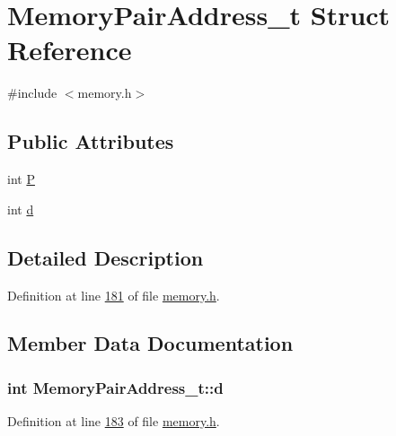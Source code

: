 \hypertarget{structMemoryPairAddress__t}{}\section{Memory\+Pair\+Address\+\_\+t Struct Reference}
\label{structMemoryPairAddress__t}


{\ttfamily \#include $<$memory.\+h$>$}

\subsection*{Public Attributes}
\begin{DoxyCompactItemize}
\item 
int \hyperlink{structMemoryPairAddress__t_a5bc11426b27565b959f280dd1a18b080}{P}
\item 
int \hyperlink{structMemoryPairAddress__t_ad608e86288286889c2658e8043414edf}{d}
\end{DoxyCompactItemize}


\subsection{Detailed Description}


Definition at line \hyperlink{memory_8h_source_l00181}{181} of file \hyperlink{memory_8h_source}{memory.\+h}.



\subsection{Member Data Documentation}
\subsubsection[{\texorpdfstring{d}{d}}]{\setlength{\rightskip}{0pt plus 5cm}int Memory\+Pair\+Address\+\_\+t\+::d}\hypertarget{structMemoryPairAddress__t_ad608e86288286889c2658e8043414edf}{}\label{structMemoryPairAddress__t_ad608e86288286889c2658e8043414edf}


Definition at line \hyperlink{memory_8h_source_l00183}{183} of file \hyperlink{memory_8h_source}{memory.\+h}.

